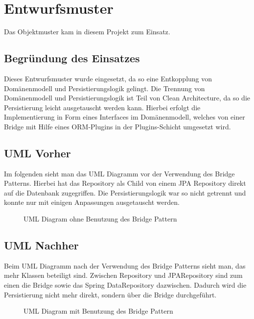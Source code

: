 
\chapter{Entwurfsmuster}
Das Objektmuster  kam in diesem Projekt zum Einsatz. 

\section{Begründung des Einsatzes}
Dieses Entwurfsmuster wurde eingesetzt, da so eine Entkopplung von Domänenmodell und Persistierungslogik gelingt. Die Trennung von Domänenmodell und Persistierungslogik ist Teil von Clean Architecture, da so die Persistierung leicht ausgetauscht werden kann. Hierbei erfolgt die Implementierung in Form eines Interfaces im Domänenmodell, welches von einer Bridge mit Hilfe eines ORM-Plugins in der Plugins-Schicht umgesetzt wird.

\section{\ac{UML} Vorher}
Im folgenden sieht man das \ac{UML} Diagramm vor der Verwendung des Bridge Patterns. Hierbei hat das Repository als Child von einem JPA Repository direkt auf die Datenbank zugegriffen. Die Persistierungslogik war so nicht getrennt und konnte nur mit einigen Anpassungen ausgetauscht werden.

        \begin{figure}[H]
	        \centering
	        \caption{UML Diagram ohne Benutzung des Bridge Pattern}
	        \label{a.2.cleanArchitecture}
        \end{figure}

\section{\ac{UML} Nachher}
Beim \ac{UML} Diagramm nach der Verwendung des Bridge Patterns sieht man, das mehr Klassen beteiligt sind. Zwischen Repository und JPARepository sind zum einen die Bridge sowie das Spring DataRepository dazwischen. Dadurch wird die Persistierung nicht mehr direkt, sondern über die Bridge durchgeführt.

        \begin{figure}[H]
	        \centering
	        \caption{UML Diagram mit Benutzung des Bridge Pattern}
	        \label{a.2.cleanArchitecture}
        \end{figure}